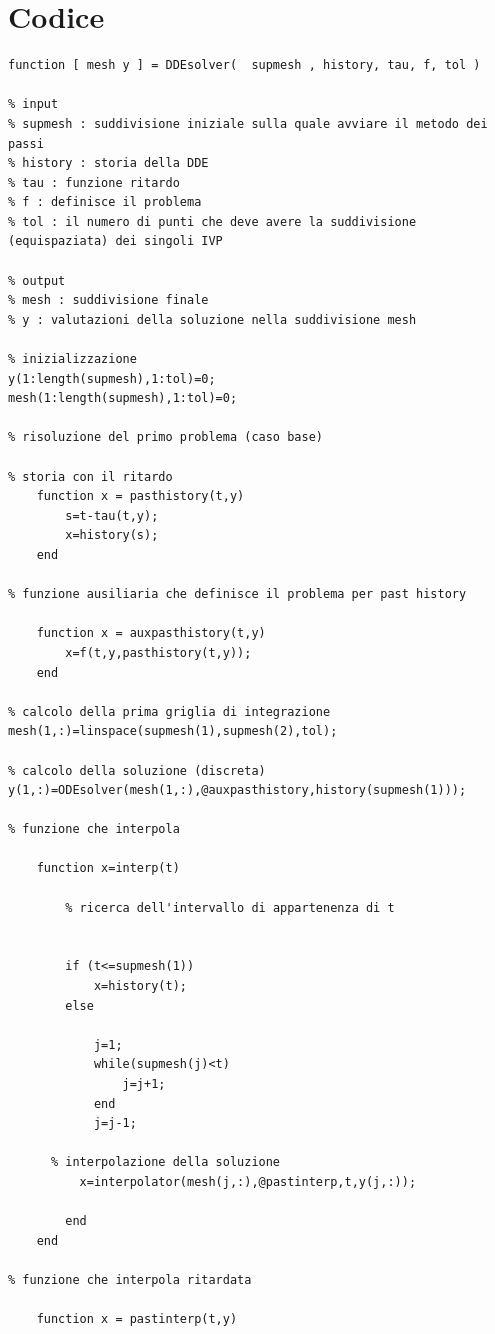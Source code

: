 \section{Codice}

\begin{lstlisting}[breaklines,caption={Implementazione del metodo dei passi per la risoluzione delle DDE}]
function [ mesh y ] = DDEsolver(  supmesh , history, tau, f, tol )

% input
% supmesh : suddivisione iniziale sulla quale avviare il metodo dei passi  
% history : storia della DDE
% tau : funzione ritardo
% f : definisce il problema
% tol : il numero di punti che deve avere la suddivisione (equispaziata) dei singoli IVP

% output
% mesh : suddivisione finale
% y : valutazioni della soluzione nella suddivisione mesh

% inizializzazione
y(1:length(supmesh),1:tol)=0;
mesh(1:length(supmesh),1:tol)=0;

% risoluzione del primo problema (caso base)

% storia con il ritardo
    function x = pasthistory(t,y)
        s=t-tau(t,y);
        x=history(s);
    end

% funzione ausiliaria che definisce il problema per past history

    function x = auxpasthistory(t,y)
        x=f(t,y,pasthistory(t,y));
    end

% calcolo della prima griglia di integrazione
mesh(1,:)=linspace(supmesh(1),supmesh(2),tol);

% calcolo della soluzione (discreta)
y(1,:)=ODEsolver(mesh(1,:),@auxpasthistory,history(supmesh(1)));

% funzione che interpola

    function x=interp(t)
        
        % ricerca dell'intervallo di appartenenza di t


        if (t<=supmesh(1))
            x=history(t);
        else
                        
            j=1;
            while(supmesh(j)<t)
                j=j+1;
            end
            j=j-1;
           
	  % interpolazione della soluzione
          x=interpolator(mesh(j,:),@pastinterp,t,y(j,:));
 
        end
    end

% funzione che interpola ritardata

    function x = pastinterp(t,y)
        

\end{lstlisting}
